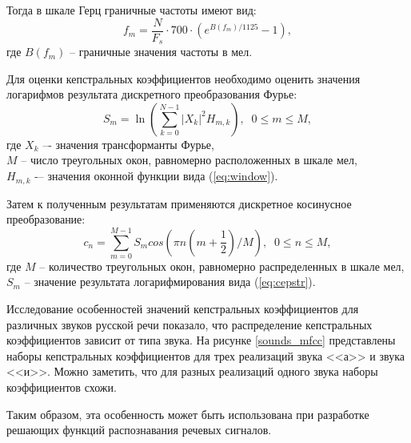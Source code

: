 \documentclass[a4paper,14pt,russian,utf8,nocolumnsxix,nocolumnxxxi,nocolumnxxxii]{eskdtext}
\begin{document}
Тогда в шкале Герц граничные частоты имеют вид:
\begin{equation}
f_m=\frac{N}{F_s}\cdot 700 \cdot (e^{B(f_m)/1125}-1),
\end{equation}
где  $B(f_m)$ -- граничные значения частоты в мел.

Для оценки кепстральных коэффициентов необходимо оценить значения логарифмов результата дискретного преобразования Фурье:
\begin{equation}
S_m=\ln(\sum_{k=0}^{N-1}|X_k|^2 H_{m,k}), \; \; 0\leq m \le M,
\label{eq:cepstr}
\end{equation}
где $X_k$ –- значения трансформанты Фурье,\\
$M$ – число треугольных окон, равномерно расположенных в шкале мел,\\
$H_{m,k}$ -– значения оконной функции вида (\ref{eq:window}).

Затем к полученным результатам применяются дискретное косинусное преобразование:
\begin{equation}
c_n=\sum_{m=0}^{M-1}S_m cos(\pi n(m+\frac{1}{2})/M), \; \; 0\leq n \le M,
\end{equation}
где  $M$ – количество треугольных окон, равномерно распределенных в шкале мел,\\
$S_m$ – значение результата логарифмирования вида (\ref{eq:cepstr}).

Исследование особенностей значений кепстральных коэффициентов для различных звуков русской речи показало, что распределение кепстральных коэффициентов зависит от типа звука. На рисунке \ref{sounds_mfcc} представлены наборы кепстральных коэффициентов для трех реализаций звука <<а>> и звука <<и>>. Можно заметить, что для разных реализаций одного звука наборы коэффициентов схожи.

Таким образом, эта особенность может быть использована при разработке решающих функций распознавания речевых сигналов.
\pagebreak
\end{document}
